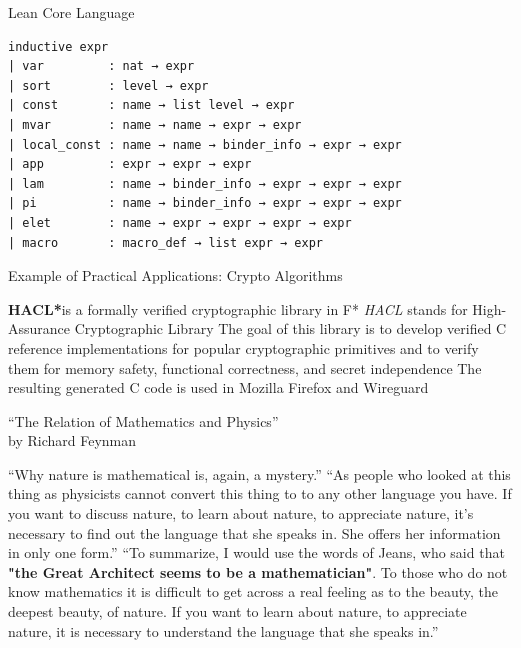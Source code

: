 \documentclass[pdf]{beamer}
\begin{document}
\begin{frame}[fragile]{Lean Core Language}
  \begin{verbatim}
inductive expr
| var         : nat → expr
| sort        : level → expr
| const       : name → list level → expr
| mvar        : name → name → expr → expr
| local_const : name → name → binder_info → expr → expr
| app         : expr → expr → expr
| lam         : name → binder_info → expr → expr → expr
| pi          : name → binder_info → expr → expr → expr
| elet        : name → expr → expr → expr → expr
| macro       : macro_def → list expr → expr
  \end{verbatim}
\end{frame}

\begin{frame}{Example of Practical Applications: Crypto Algorithms}
  \begin{outline}
    \1 \textbf{HACL*}\footnotemark[5] is a formally verified cryptographic library in F*
    \1 {\em HACL} stands for High-Assurance Cryptographic Library
    \1 The goal of this library is to develop verified C reference implementations for popular cryptographic primitives and to verify them for memory safety, functional correctness, and secret independence
    \1 The resulting generated C code is used in Mozilla Firefox and Wireguard
  \end{outline}
\end{frame}

\begin{frame}{``The Relation of Mathematics and Physics''\footnotemark[6] \\ by Richard Feynman}
  \small
  \begin{outline}
    \1 ``Why nature is mathematical is, again, a mystery.''
    \1 ``As people who looked at this thing as physicists cannot convert this thing to to any other language you have. If you want to discuss nature, to learn about nature, to appreciate nature, it's necessary to find out the language that she speaks in. She offers her information in only one form.''
    \1 ``To summarize, I would use the words of Jeans, who said that \textbf{"the Great Architect seems to be a mathematician"}. To those who do not know mathematics it is difficult to get across a real feeling as to the beauty, the deepest beauty, of nature. If you want to learn about nature, to appreciate nature, it is necessary to understand the language that she speaks in.''
  \end{outline}
\end{frame}
\end{document}
